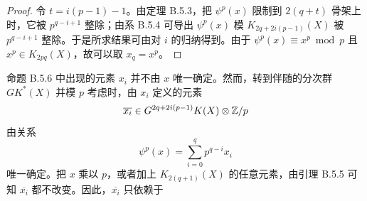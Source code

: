 \begin{proof}
  令 $t=i(p-1)-1$。由定理 B.5.3，把 $\psi^p(x)$ 限制到 $2(q+t)$ 骨架上时，它被 $p^{q-i+1}$ 整除；由系 B.5.4 可导出 $\psi^p(x)$ 模 $K_{2q+2i(p-1)}(X)$ 被 $p^{q-i+1}$ 整除。于是所求结果可由对 $i$ 的归纳得到。由于 $\psi^p(x)\equiv x^p\bmod p$ 且 $x^p\in K_{2pq}(X)$，故可以取 $x_q=x^p$。
\end{proof}


命题 B.5.6 中出现的元素 $x_i$ 并不由 $x$ 唯一确定。然而，转到伴随的分次群 $GK^*(X)$ 并模 $p$ 考虑时，由 $x_i$ 定义的元素
\[
  \overline{x_i}\in G^{2q+2i(p-1)}K(X)\otimes\mathbb{Z}/p
\]
由关系
\[
  \psi^p(x)=\sum_{i=0}^{q}p^{q-i}x_i
\]
唯一确定。把 $x$ 乘以 $p$，或者加上 $K_{2(q+1)}(X)$ 的任意元素，由引理 B.5.5 可知 $\overline{x_i}$ 都不改变。因此，$\overline{x_i}$ 只依赖于

